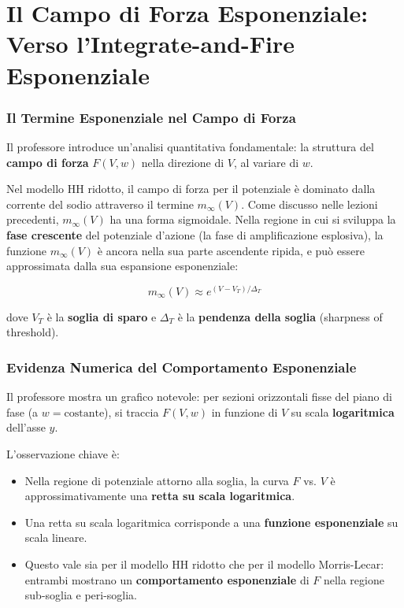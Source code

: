 \section{Il Campo di Forza Esponenziale: Verso l'Integrate-and-Fire Esponenziale}

\subsubsection{Il Termine Esponenziale nel Campo di Forza}

Il professore introduce un'analisi quantitativa fondamentale: la struttura del \textbf{campo di forza} $F(V, w)$ nella direzione di $V$, al variare di $w$.

Nel modello HH ridotto, il campo di forza per il potenziale è dominato dalla corrente del sodio attraverso il termine $m_\infty(V)$. Come discusso nelle lezioni precedenti, $m_\infty(V)$ ha una forma sigmoidale. Nella regione in cui si sviluppa la \textbf{fase crescente} del potenziale d'azione (la fase di amplificazione esplosiva), la funzione $m_\infty(V)$ è ancora nella sua parte ascendente ripida, e può essere approssimata dalla sua espansione esponenziale:

\begin{equation}
m_\infty(V) \approx e^{(V - V_T)/\Delta_T}
\end{equation}

dove $V_T$ è la \textbf{soglia di sparo} e $\Delta_T$ è la \textbf{pendenza della soglia} (sharpness of threshold).

\subsubsection{Evidenza Numerica del Comportamento Esponenziale}

Il professore mostra un grafico notevole: per sezioni orizzontali fisse del piano di fase (a $w = \text{costante}$), si traccia $F(V, w)$ in funzione di $V$ su scala \textbf{logaritmica} dell'asse $y$.

L'osservazione chiave è:
\begin{itemize}
    \item Nella regione di potenziale attorno alla soglia, la curva $F$ vs. $V$ è approssimativamente una \textbf{retta su scala logaritmica}.
    \item Una retta su scala logaritmica corrisponde a una \textbf{funzione esponenziale} su scala lineare.
    \item Questo vale sia per il modello HH ridotto che per il modello Morris-Lecar: entrambi mostrano un \textbf{comportamento esponenziale} di $F$ nella regione sub-soglia e peri-soglia.
\end{itemize}

